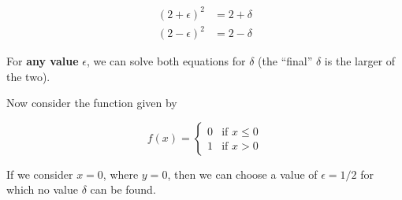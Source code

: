 \begin{align}
(2+\epsilon)^2 & = 2+\delta \\
(2-\epsilon)^2 & = 2-\delta
\end{align}


For \textbf{any value} \(\epsilon\), we can solve both equations for
\(\delta\) (the ``final'' \(\delta\) is the larger of the two).

Now consider the function given by

\[
f(x) = \begin{cases}
0 & \mbox{if } x \leq 0 \\
1 & \mbox{if } x > 0 \end{cases}
\]

If we consider \(x=0\), where \(y=0\), then we can choose a value of
\(\epsilon=1/2\) for which no value \(\delta\) can be found.
